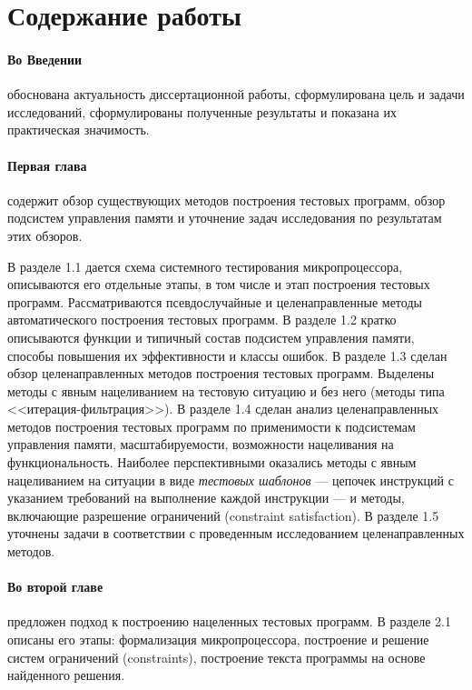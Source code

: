 \documentclass[14pt,autoref,href
,facsimile
]{disser}
\begin{document}
%
%


\section*{Содержание работы}

\paragraph{Во Введении} обоснована актуальность диссертационной работы,
сформулирована цель и задачи исследований, сформулированы полученные результаты и показана их
практическая значимость.

%
%


\paragraph{Первая глава} содержит обзор существующих методов построения тестовых программ, обзор подсистем управления памяти и уточнение задач исследования по результатам этих обзоров.

В разделе 1.1 дается схема системного тестирования микропроцессора, описываются его отдельные этапы, в том числе и этап построения тестовых программ. Рассматриваются псевдослучайные и целенаправленные методы автоматического построения тестовых программ. В разделе 1.2 кратко описываются функции и типичный состав подсистем управления памяти, способы повышения их эффективности и классы ошибок. В разделе 1.3 сделан обзор целенаправленных методов построения тестовых программ. Выделены методы с явным нацеливанием на тестовую ситуацию и без него (методы типа <<итерация-фильтрация>>). В разделе 1.4 сделан анализ целенаправленных методов построения тестовых программ по применимости к подсистемам управления памяти, масштабируемости, возможности нацеливания на функциональность. Наиболее перспективными оказались методы с явным нацеливанием на ситуации в виде \emph{тестовых шаблонов} --- цепочек инструкций с указанием требований на выполнение каждой инструкции --- и методы, включающие разрешение ограничений (constraint satisfaction). В разделе 1.5 уточнены задачи в соответствии с проведенным исследованием целенаправленных методов.

\paragraph{Во второй главе} предложен подход к построению нацеленных тестовых программ. В разделе 2.1 описаны его этапы: формализация микропроцессора, построение и решение систем ограничений (constraints), построение текста программы на основе найденного решения.
\end{document}
